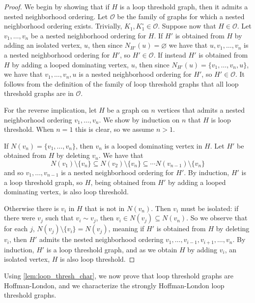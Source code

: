 \documentclass[11pt]{article}
\theoremstyle{definition}
\renewcommand{\loop}{\circ}
\begin{document}
\begin{proof}
We begin by showing that if $H$ is a loop threshold graph, then it admits a nested neighborhood ordering. Let ${\mathcal O}$ be the family of graphs for which a nested neighborhood ordering exists. Trivially, $K_1, K^{\loop}_1 \in {\mathcal O}$. Suppose now that $H \in {\mathcal O}$. Let $v_1, \ldots, v_n$ be a nested neighborhood ordering for $H$. If $H'$ is obtained from $H$ by adding an isolated vertex, $u$, then since $N_{H'}(u)=\varnothing$ we have that $u, v_1, \ldots, v_{n}$ is a nested neighborhood ordering for $H'$, so $H' \in {\mathcal O}$. If instead $H'$ is obtained from $H$ by adding a looped dominating vertex, $u$, then since $N_{H'}(u)=\{v_1, \ldots, v_{n}, u\}$, we have that $v_1, \ldots, v_{n}, u$ is a nested neighborhood ordering for $H'$, so $H' \in {\mathcal O}$. It follows from the definition of the family of loop threshold graphs that all loop threshold graphs are in ${\mathcal O}$.    

For the reverse implication, let $H$ be a graph on $n$ vertices that admits a nested neighborhood ordering $v_1, \ldots, v_n$. We show by induction on $n$ that $H$ is loop threshold. When $n=1$ this is clear, so we assume $n > 1$. 

If $N(v_n)=\{v_1, \ldots, v_n\}$, then $v_n$ is a looped dominating vertex in $H$. Let $H'$ be obtained from $H$ by deleting $v_n$. We have that
\[
N(v_1)\setminus \{v_n\} \subseteq N(v_2)\setminus \{v_n\} \subseteq \cdots N(v_{n-1})\setminus \{v_n\}
\]
and so $v_1, \ldots, v_{n-1}$ is a nested neighborhood ordering for $H'$. By induction, $H'$ is a loop threshold graph, so $H$, being obtained from $H'$ by adding a looped dominating vertex, is also loop threshold.

Otherwise there is $v_i$ in $H$ that is not in $N(v_n)$. Then $v_i$ must be isolated: if there were $v_j$ such that $v_i \sim v_j$, then $v_i \in N(v_j) \subseteq N(v_n)$. So we observe that for each $j$, $N(v_j) \setminus \{v_i\} = N(v_j)$, meaning if $H'$ is obtained from $H$ by deleting $v_i$, then $H'$ admits the nested neighborhood ordering $v_1, \ldots, v_{i-1}, v_{i+1}, \ldots, v_n$. By induction, $H'$ is a loop threshold graph, and as we obtain $H$ by adding $v_i$, an isolated vertex, $H$ is also loop threshold.
\end{proof}

Using \cref{lem:loop_thresh_char}, we now prove that loop threshold graphs are Hoffman-London, and we characterize the strongly Hoffman-London loop threshold graphs.
\end{document}
